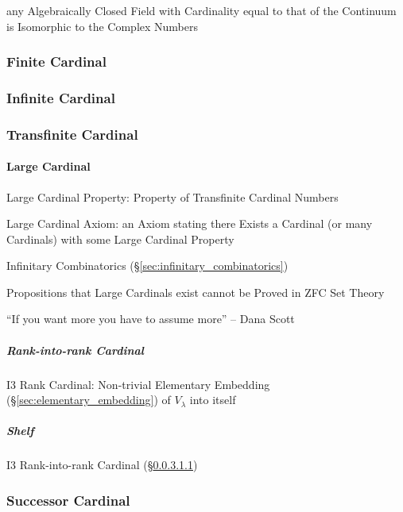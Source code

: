 any Algebraically Closed Field with Cardinality equal to that of the Continuum
is Isomorphic to the Complex Numbers



\subsubsection{Finite Cardinal}\label{sec:finite_cardinal}

\subsubsection{Infinite Cardinal}\label{sec:infinite_cardinal}

\subsubsection{Transfinite Cardinal}\label{sec:transfinite_cardinal}

\paragraph{Large Cardinal}\label{sec:large_cardinal}\hfill

Large Cardinal Property: Property of Transfinite Cardinal Numbers

Large Cardinal Axiom: an Axiom stating there Exists a Cardinal (or
many Cardinals) with some Large Cardinal Property

Infinitary Combinatorics (\S\ref{sec:infinitary_combinatorics})

Propositions that Large Cardinals exist cannot be Proved in ZFC Set
Theory

``If you want more you have to assume more'' -- Dana Scott



\subparagraph{Rank-into-rank Cardinal}\label{sec:rank_into_rank}\hfill

I3 Rank Cardinal: Non-trivial Elementary Embedding
(\S\ref{sec:elementary_embedding}) of $V_\lambda$ into itself



\subparagraph{Shelf}\label{sec:shelf}

I3 Rank-into-rank Cardinal (\S\ref{sec:rank_into_rank})



\subsubsection{Successor Cardinal}\label{sec:successor_cardinal}



